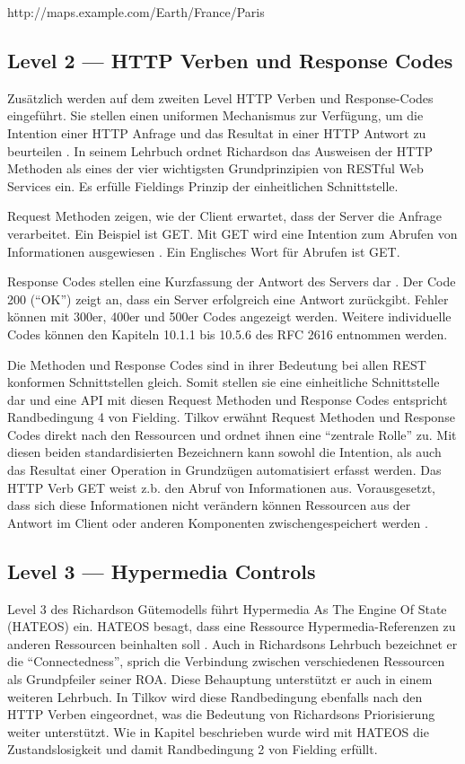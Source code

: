 http://maps.example.com/Earth/France/Paris

\subsection{Level 2 — HTTP Verben und Response Codes}

Zusätzlich werden auf dem zweiten Level HTTP Verben und Response-Codes eingeführt. Sie stellen einen uniformen Mechanismus zur Verfügung, um die Intention einer HTTP Anfrage und das Resultat in einer HTTP Antwort zu beurteilen  . In seinem Lehrbuch ordnet Richardson das Ausweisen der HTTP Methoden als eines der vier wichtigsten Grundprinzipien von RESTful Web Services ein. Es erfülle Fieldings Prinzip der einheitlichen Schnittstelle.

Request Methoden zeigen, wie der Client erwartet, dass der Server die Anfrage verarbeitet. Ein Beispiel ist GET. Mit GET wird eine Intention zum Abrufen von Informationen ausgewiesen . Ein Englisches Wort für Abrufen ist GET. 

Response Codes stellen eine Kurzfassung der Antwort des Servers dar . Der Code 200 (“OK”) zeigt an, dass ein Server erfolgreich eine Antwort zurückgibt. Fehler können mit 300er, 400er und 500er Codes angezeigt werden. Weitere individuelle Codes können den Kapiteln 10.1.1 bis 10.5.6 des RFC 2616 entnommen werden. 

Die Methoden und Response Codes sind in ihrer Bedeutung bei allen REST konformen Schnittstellen gleich. Somit stellen sie eine einheitliche Schnittstelle dar und eine API mit diesen Request Methoden und Response Codes entspricht Randbedingung 4 von Fielding. Tilkov erwähnt Request Methoden und Response Codes direkt nach den Ressourcen und ordnet ihnen eine “zentrale Rolle” zu. Mit diesen beiden standardisierten Bezeichnern kann sowohl die Intention, als auch das Resultat einer Operation in Grundzügen automatisiert erfasst werden. Das HTTP Verb GET weist z.b. den Abruf von Informationen aus. Vorausgesetzt, dass sich diese Informationen nicht verändern können Ressourcen aus der Antwort im Client oder anderen Komponenten zwischengespeichert werden .

\subsection{Level 3 — Hypermedia Controls}

Level 3 des Richardson Gütemodells führt Hypermedia As The Engine Of State (HATEOS) ein. HATEOS besagt, dass eine Ressource Hypermedia-Referenzen zu anderen Ressourcen beinhalten soll   . Auch in Richardsons Lehrbuch bezeichnet er die “Connectedness”, sprich die Verbindung zwischen verschiedenen Ressourcen als Grundpfeiler seiner ROA. Diese Behauptung unterstützt er auch in einem weiteren Lehrbuch. In Tilkov wird diese Randbedingung ebenfalls nach den HTTP Verben eingeordnet, was die Bedeutung von Richardsons Priorisierung weiter unterstützt. Wie in Kapitel beschrieben wurde wird mit HATEOS die Zustandslosigkeit und damit Randbedingung 2 von Fielding erfüllt. 

